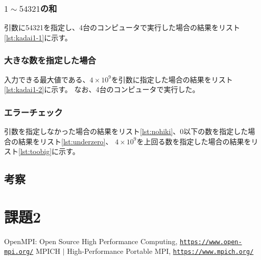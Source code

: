 \documentclass[a4j,titlepage]{jsarticle}
\begin{document}
\subsubsection{$1 \sim 54321$の和}
引数に54321を指定し、4台のコンピュータで実行した場合の結果をリスト\ref{lst:kadai1-1}に示す。

\subsubsection{大きな数を指定した場合}
入力できる最大値である、$4 \times 10^9$を引数に指定した場合の結果をリスト\ref{lst:kadai1-2}に示す。
なお、4台のコンピュータで実行した。

\subsubsection{エラーチェック}
引数を指定しなかった場合の結果をリスト\ref{lst:nohiki}、0以下の数を指定した場合の結果をリスト\ref{lst:underzero}、
$4 \times 10^9$を上回る数を指定した場合の結果をリスト\ref{lst:toobig}に示す。

\subsection{考察}


\section{課題2}



\begin{thebibliography}{9}
   OpenMPI: Open Source High Performance Computing, \texttt{\url{https://www.open-mpi.org/}}
   MPICH $|$ High-Performance Portable MPI, \texttt{\url{https://www.mpich.org/}}
\end{thebibliography}
\end{document}
